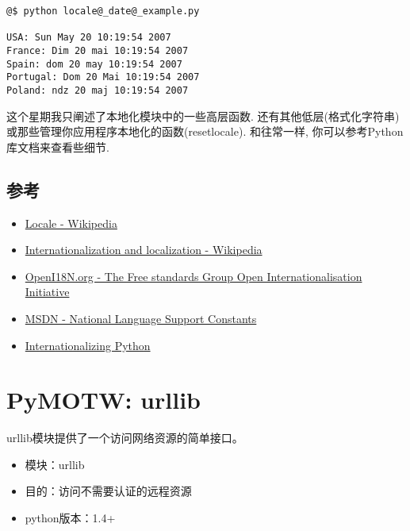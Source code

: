 \documentclass[letterpaper,10pt,english]{manual}
\begin{document}
\begin{Verbatim}[commandchars=@\[\]]
@$ python locale@_date@_example.py

USA: Sun May 20 10:19:54 2007
France: Dim 20 mai 10:19:54 2007
Spain: dom 20 may 10:19:54 2007
Portugal: Dom 20 Mai 10:19:54 2007
Poland: ndz 20 maj 10:19:54 2007
\end{Verbatim}

这个星期我只阐述了本地化模块中的一些高层函数. 还有其他低层(格式化字符串)或那些管理你应用程序本地化的函数(resetlocale). 和往常一样, 你可以参考Python库文档来查看些细节.


\subsection{参考}
\begin{itemize}
\item {} 
\href{http://en.wikipedia.org/wiki/Locale}{Locale - Wikipedia}

\item {} 
\href{http://en.wikipedia.org/wiki/Internationalization\_and\_localization}{Internationalization and localization - Wikipedia}

\item {} 
\href{http://www.openi18n.org/}{OpenI18N.org - The Free standards Group Open Internationalisation Initiative}

\item {} 
\href{http://msdn.microsoft.com/library/default.asp?url=/library/en-us/intl/nls\_238z.asp}{MSDN - National Language Support Constants}

\item {} 
\href{http://www.python.org/workshops/1997-10/proceedings/loewis.html}{Internationalizing Python}

\end{itemize}

\resetcurrentobjects


\section{PyMOTW: urllib}

urllib模块提供了一个访问网络资源的简单接口。
\begin{itemize}
\item {} 
模块：urllib

\item {} 
目的：访问不需要认证的远程资源

\item {} 
python版本：1.4+

\end{itemize}
\end{document}
